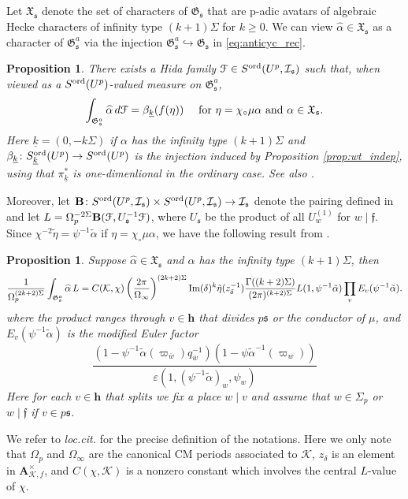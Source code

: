 \documentclass[leqno]{amsart}
\newtheorem{prop}[thm]{Proposition}
\theoremstyle{definition}
\theoremstyle{remark}
\newcommand{\A}{\mathbf A}
\newcommand{\finite}{\mathbf{h}}
\newcommand{\ff}{\mathfrak{f}}
\newcommand{\fs}{\mathfrak{s}}
\newcommand{\K}{{\mathcal{K}}} %
\newcommand{\bw}{{\overline{w}}}
\newcommand{\fG}{\mathfrak{G}}
\newcommand{\fX}{\mathfrak{X}}
\newcommand{\wt}[1]{\underline{ #1 }}
\newcommand{\euF}{\EuScript{F}} %
\newcommand{\I}{\mathcal{I}} %
\newcommand{\ord}{\textnormal{ord}} %
\begin{document}
Let $\fX_\fs$ denote the set of characters of $\fG_\fs$
that are p-adic avatars of algebraic Hecke characters 
of infinity type $(k+1)\Sigma$ for $k\geq 0$.
We can view $\widehat{\alpha}\in\fX_\fs$ as a character of
$\fG_\fs^a$ via the injection $\fG_\fs^a\hookrightarrow\fG_\fs$
in \eqref{eq:anticyc_rec}.
\begin{prop}\cite[Thm. 6.8]{lee}\label{prop:family}
    There exists a Hida family
    $\euF\in S^{\ord}(U^p, \I_\fs)$ such that,
    when viewed as a $S^{\ord}(U^p)$-valued measure on $\fG_\fs^a$,
    \[
    \int_{\fG_\fs^a} \widehat{\alpha}\,d\euF
    =\beta_{\wt{k}}(f(\eta))\quad\text{ for }
    \eta=\chi_\circ\mu\alpha\text{ and }
    \alpha\in \fX_\fs.
    \]
    Here $\wt{k}=(0,-k\Sigma)$ if $\alpha$ has the infinity type
    $(k+1)\Sigma$ and $\beta_{\wt{k}}\colon 
    S^{\ord}_{\wt{k}}(U^p)\to S^{\ord}(U^p)$
    is the injection induced by Proposition \ref{prop:wt_indep},
    using that $\pi_{\wt{k}}^*$ is one-dimenlional in the ordinary case.
    See also \cite[Prop 2.22]{ger}.
\end{prop}

Moreover, let
$\mathbf{B}\colon S^{\ord}(U^p,\I_\fs)\times 
S^{\ord}(U^p,\I_\fs)\to\I_\fs$ 
denote the pairing defined in \cite{lee}
and let $L=\Omega_p^{-2\Sigma}\mathbf{B}(\euF,U_\fs^{-1}\euF)$,
where $U_{\fs}$ be the product of all $U_w^{(1)}$ for $w\mid\ff$.
Since $\chi^{-2}\tilde{\eta}=\psi^{-1}\tilde{\alpha}$
if $\eta=\chi_\circ\mu\alpha$,
we have the following result from 
\cite[Thm 6.11]{lee}.
\begin{prop}\label{prop:L-function_at_s}
Suppose $\widehat{\alpha}\in\fX_\fs$ and $\alpha$
has the infinity type $(k+1)\Sigma$, then
\begin{equation}
        \frac{1}{\Omega_p^{(2k+2)\Sigma}}
        \int_{\fG_{\fs}^a}\widehat{\alpha}\,L=C(\K,\chi)
        \left(\frac{2\pi}{\Omega_\infty}\right)^{(2k+2)\Sigma}
    \textnormal{Im}(\delta)^{k}\tilde{\eta}(z_\delta^{-1})
    \frac{\Gamma((k+2)\Sigma)}{(2\pi)^{(k+2)\Sigma}}
    L(1,\psi^{-1}\tilde{\alpha})
    \prod_{v}E_v(\psi^{-1}\tilde{\alpha}).
\end{equation}
where the product ranges through $v\in\finite$
that divides $p\fs$ or the conductor of $\mu$, and 
$E_v(\psi^{-1}\tilde{\alpha})$ is the modified Euler factor 
\[
\frac{
(1-\psi^{-1}\tilde{\alpha}(\varpi_\bw)q_\bw^{-1})
(1-\psi\tilde{\alpha}^{-1}(\varpi_w))}
{{\varepsilon(1,(\psi^{-1}\tilde{\alpha})_w,\psi_w)}}
\]
Here for each $v\in\finite$ that splits we fix a place $w\mid v$
and assume that $w\in\Sigma_p$ or $w\mid \ff$ if $v\in p\fs$.
\end{prop}
We refer to \textit{loc.cit.} for the precise definition
of the notations.
Here we only note that
$\Omega_p$ and $\Omega_\infty$
are the canonical CM periods associated to $\K$,
$z_\delta$ is an element in $\A_{\K,f}^\times$, and 
$C(\chi,\K)$ is a nonzero 
constant which involves the central $L$-value
of $\chi$.
\end{document}
